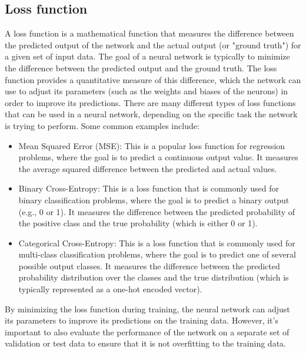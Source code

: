 \documentclass[a4paper, noexaminfo]{sapthesis}
\begin{document}
\subsection{Loss function} \label{sec:loss}
A loss function is a mathematical function that measures the difference 
between the predicted output of the network and the actual output (or 
"ground truth") for a given set of input data.\newline 
The goal of a neural network is typically to minimize the difference 
between the predicted output and the ground truth. The loss function 
provides a quantitative measure of this difference, which the network 
can use to adjust its parameters (such as the weights and biases of the 
neurons) in order to improve its predictions.\newline 
There are many different types of loss functions that can be used in a 
neural network, depending on the specific task the network is trying to 
perform. Some common examples include:
\begin{itemize}
\item{Mean Squared Error (MSE)}: This is a popular loss function for regression 
problems, where the goal is to predict a continuous output value. It 
measures the average squared difference between the predicted and actual 
values.
\item{Binary Cross-Entropy}: This is a loss function that is commonly used for 
binary classification problems, where the goal is to predict a binary 
output (e.g., 0 or 1). It measures the difference between the predicted 
probability of the positive class and the true probability (which is 
either 0 or 1).
\item{Categorical Cross-Entropy}: This is a loss function that is commonly used 
for multi-class classification problems, where the goal is to predict one 
of several possible output classes. It measures the difference between the 
predicted probability distribution over the classes and the true 
distribution (which is typically represented as a one-hot encoded vector).
\end{itemize}
By minimizing the loss function during training, the neural network 
can adjust its parameters to improve its predictions on the training 
data. However, it's important to also evaluate the performance of the 
network on a separate set of validation or test data to ensure that 
it is not overfitting to the training data.
\end{document}

